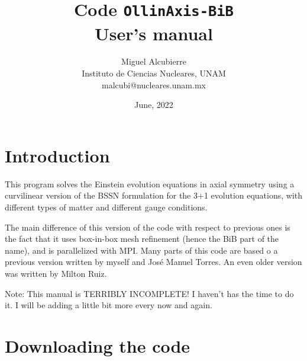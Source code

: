 \documentclass[12pt]{article}
\begin{document}

\renewcommand{\theequation}{\thesection.\arabic{equation}}

\parindent 0mm



\title{Code \texttt{OllinAxis-BiB} \\ User's manual}

\author{Miguel Alcubierre \\
Instituto de Ciencias Nucleares, UNAM \\
malcubi@nucleares.unam.mx}

\date{June, 2022}

\maketitle

\tableofcontents



\pagebreak

\section{Introduction}

This program solves the Einstein evolution equations in axial symmetry
using a curvilinear version of the BSSN formulation for the 3+1
evolution equations, with different types of matter and different
gauge conditions.

The main difference of this version of the code with respect to
previous ones is the fact that it uses box-in-box mesh refinement
(hence the BiB part of the name), and is parallelized with MPI.
Many parts of this code are based o a previous version written
by myself and José Manuel Torres.  An even older version was
written by Milton Ruiz.

Note: This manual is TERRIBLY INCOMPLETE!  I haven't has the
time to do it.  I will be adding a little bit more every now
and again. \\



\section{Downloading the code}
\end{document}
